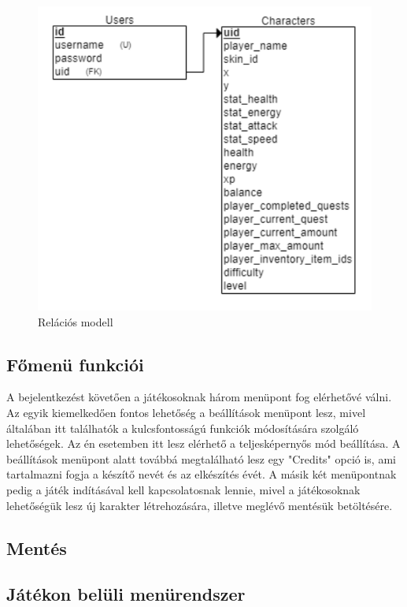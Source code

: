 \begin{figure}[H]
    \centering
    \includegraphics[width=10.0truecm]{images/RelationModell.png}
    \caption{Relációs modell}
    \label{fig:Relációs modell}
\end{figure}

\subsection{Főmenü funkciói}

A bejelentkezést követően a játékosoknak három menüpont fog elérhetővé válni. Az egyik kiemelkedően fontos lehetőség a beállítások menüpont lesz, mivel általában itt találhatók a kulcsfontosságú funkciók módosítására szolgáló lehetőségek. Az én esetemben itt lesz elérhető a teljesképernyős mód beállítása. A beállítások menüpont alatt továbbá megtalálható lesz egy "Credits" opció is, ami tartalmazni fogja a készítő nevét és az elkészítés évét. A másik két menüpontnak pedig a játék indításával kell kapcsolatosnak lennie, mivel a játékosoknak lehetőségük lesz új karakter létrehozására, illetve meglévő mentésük betöltésére.

\subsection{Mentés}


\subsection{Játékon belüli menürendszer}


